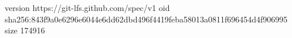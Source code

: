 version https://git-lfs.github.com/spec/v1
oid sha256:843f9a0e6296e6044e6dd62dbd496f4419feba58013a0811f696454d4f906995
size 174916
